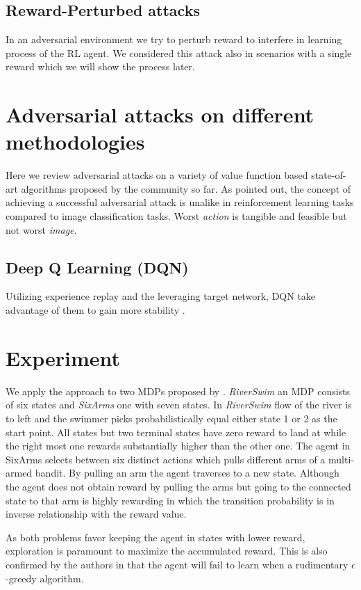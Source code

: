 \documentclass{article}
\begin{document}
    \subsection{Reward-Perturbed attacks}
    In an adversarial environment we try to perturb reward to interfere in learning process of the RL agent. We considered this attack also in scenarios with a single reward which we will show the process later.

    \section{Adversarial attacks on different methodologies}
    Here we review adversarial attacks on a variety of value function based state-of-art algorithms proposed by the community so far. As \cite{Pattanaik2018} pointed out, the concept of achieving a successful adversarial attack is unalike in reinforcement learning tasks compared to image classification tasks. Worst \textit{action} is tangible and feasible but not worst \textit{image}.

    \subsection{Deep Q Learning (DQN)}
    Utilizing experience replay and the leveraging target network, DQN take advantage of them to gain more stability \cite{Pattanaik2018}.

    \section{Experiment}
    We apply the approach to two MDPs proposed by \cite{Strehl2004AnProcesses}. \textit{RiverSwim} an MDP consists of six states and \textit{SixArms} one with seven states. In \textit{RiverSwim} flow of the river is to left and the swimmer picks probabilistically equal either state 1 or 2 as the start point. All states but two terminal states have zero reward to land at while the right most one rewards substantially higher than the other one. The agent in SixArms selects between six distinct actions which pulls different arms of a multi-armed bandit. By pulling an arm the agent traverses to a new state. Although the agent does not obtain reward by pulling the arms but going to the connected state to that arm is highly rewarding in which the transition probability is in inverse relationship with the reward value.

    As both problems favor keeping the agent in states with lower reward, exploration is paramount to maximize the accumulated reward. This is also confirmed by the authors in \cite{Strehl2004AnProcesses} that the agent will fail to learn when a rudimentary $\epsilon$-greedy algorithm.
\end{document}
